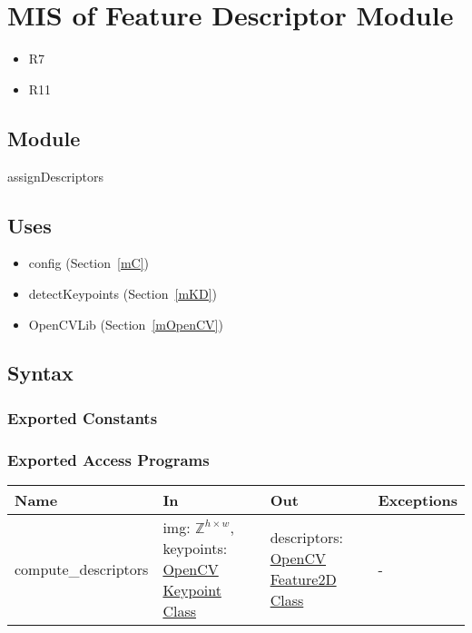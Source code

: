 \documentclass[12pt, titlepage]{article}
\begin{document}
\section{MIS of Feature Descriptor Module} \label{mFD}
\begin{itemize}
  \item R7
  \item R11
\end{itemize}
\subsection{Module}

assignDescriptors

\subsection{Uses}
\begin{itemize}
  \item config (Section~\ref{mC})
  \item detectKeypoints (Section~\ref{mKD})
  \item OpenCVLib (Section~\ref{mOpenCV})
\end{itemize}

\subsection{Syntax}

\subsubsection{Exported Constants}

\subsubsection{Exported Access Programs}

\begin{center}
\begin{tabular}{p{4cm} p{5cm} p{4cm} p{2cm}}
\hline
\textbf{Name} & \textbf{In} & \textbf{Out} & \textbf{Exceptions} \\
\hline
compute\_descriptors
& img: $\mathbb{Z}^{h \times w}$, \newline
keypoints: \href{https://docs.opencv.org/3.4/d2/d29/classcv_1_1KeyPoint.html}{OpenCV Keypoint Class}
& descriptors: \href{https://docs.opencv.org/4.x/d0/d13/classcv_1_1Feature2D.html}{OpenCV Feature2D Class}
& - \\
\hline
\end{tabular}
\end{center}
\end{document}
